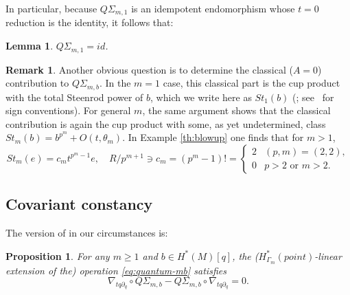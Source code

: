 \documentclass[JEP,XML,SOM,Unicode,NoFloatCountersInSection,published]{cedram}
\theoremstyle{plain}
\newtheorem{lemma}[theorem]{Lemma}
\newtheorem{proposition}[theorem]{Proposition}
\theoremstyle{definition}
\newtheorem{remark}[theorem]{Remark}
\begin{document}
In particular, because $Q\Sigma_{m,1}$ is an idempotent endomorphism whose $t = 0$ reduction is the identity, it follows that:

\begin{lemma} \label{th:unitality}
$Q\Sigma_{m,1} = \mathit{id}$.
\end{lemma}

\begin{remark}
Another obvious question is to determine the classical ($A = 0$) contribution to $Q\Sigma_{m,b}$. In the $m = 1$ case, this classical part is the cup product with the total Steenrod power of $b$, which we write here as $\mathit{St}_1(b)$ (\cite[Lem.\,4.6]{seidel-wilkins21}; see~\cite{seidel23} for sign conventions). For general $m$, the same argument shows that the classical contribution is again the cup product with some, as yet undetermined, class $\mathit{St}_m(b) = b^{p^m} + O(t,\theta_m)$. In Example \ref{th:blowup} one finds that for $m>1$,
\begin{equation*}
\mathit{St}_m(e) = c_m t^{p^m-1}e, \quad
R/p^{m+1} \ni c_m = (p^m-1)! = \begin{cases} 2 & (p,m) = (2,2), \\
0 & \text{$p>2$ or $m>2$.} \end{cases}
\end{equation*}
\end{remark}

\subsection{Covariant constancy}
The version of \cite[Th.\,1.4]{seidel-wilkins21} in our circumstances is:

\begin{proposition} \label{th:covariantly-constant}
For any $m \geq 1$ and $b \in H^*(M)[q]$, the ($H^*_{\Gamma_m}(\mathit{point})$-linear extension of the) operation \eqref{eq:quantum-mb} satisfies
\begin{equation}\label{eq:derivative-of-qsigma}
\nabla_{tq\partial_q} \circ Q\Sigma_{m,b} - Q\Sigma_{m,b} \circ \nabla_{tq\partial_q} = 0.
\end{equation}
\end{proposition}
\end{document}
